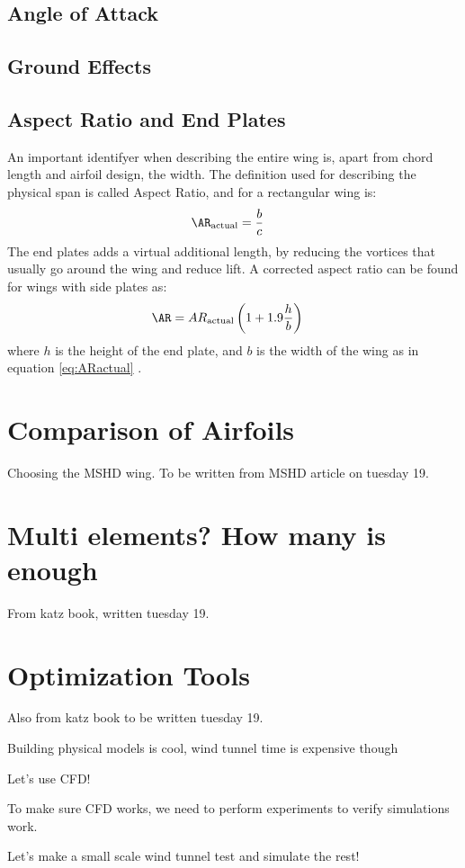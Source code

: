   \subsection{Angle of Attack}

  \subsection{Ground Effects}

  \subsection{Aspect Ratio and End Plates}

    An important identifyer when describing the entire wing is, apart from chord length and airfoil design, the width. The definition used for describing the physical span is called Aspect Ratio, and for a rectangular wing is:
    \begin{align}
        \AR_\text{actual} &= \frac{b}{c}
        \label{eq:ARactual}
    \end{align}
    The end plates adds a virtual additional length, by reducing the vortices that usually go around the wing and reduce lift. A corrected aspect ratio can be found for wings with side plates as:
    \begin{align}
      \AR &= AR_\text{actual}\left(1+1.9\frac{h}{b}\right)
    \end{align}
    where $h$ is the height of the end plate, and $b$ is the width of the wing as in equation \ref{eq:ARactual} \cite{jkatz}.


\section{Comparison of Airfoils}
Choosing the MSHD wing.
To be written from MSHD article on tuesday 19.

\section{Multi elements? How many is enough}
From katz book, written tuesday 19.

\section{Optimization Tools}

Also from katz book to be written tuesday 19.

Building physical models is cool, wind tunnel time is expensive though

Let's use CFD!

To make sure CFD works, we need to perform experiments to verify simulations work.

Let's make a small scale wind tunnel test and simulate the rest!

